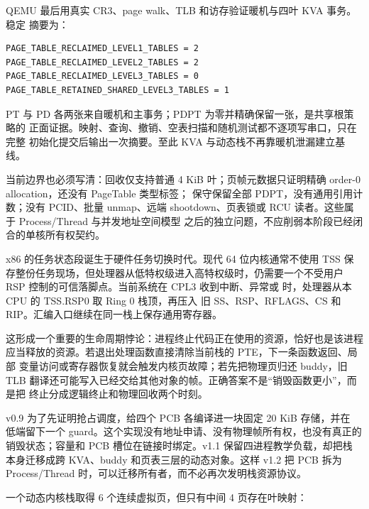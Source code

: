 QEMU 最后用真实 CR3、page walk、TLB 和访存验证暖机与四叶 KVA 事务。稳定
摘要为：

\begin{verbatim}
PAGE_TABLE_RECLAIMED_LEVEL1_TABLES = 2
PAGE_TABLE_RECLAIMED_LEVEL2_TABLES = 2
PAGE_TABLE_RECLAIMED_LEVEL3_TABLES = 0
PAGE_TABLE_RETAINED_SHARED_LEVEL3_TABLES = 1
\end{verbatim}

PT 与 PD 各两张来自暖机和主事务；PDPT 为零并精确保留一张，是共享根策略的
正面证据。映射、查询、撤销、空表扫描和随机测试都不逐项写串口，只在完整
初始化提交后输出一次摘要。至此 KVA 与动态栈不再靠暖机泄漏建立基线。

当前边界也必须写清：回收仅支持普通 4 KiB 叶；页帧元数据只证明精确
order-0 allocation，还没有 PageTable 类型标签；
保守保留全部 PDPT，没有通用引用计数；没有 PCID、批量 unmap、远端
shootdown、页表锁或 RCU 读者。这些属于 Process/Thread 与并发地址空间模型
之后的独立问题，不应削弱本阶段已经闭合的单核所有权契约。

x86 的任务状态段诞生于硬件任务切换时代。现代 64 位内核通常不使用 TSS
保存整份任务现场，但处理器从低特权级进入高特权级时，仍需要一个不受用户
RSP 控制的可信落脚点。当前系统在 CPL3 收到中断、异常或
 时，处理器从本 CPU 的 TSS.RSP0 取 Ring 0 栈顶，再压入
旧 SS、RSP、RFLAGS、CS 和 RIP。汇编入口继续在同一栈上保存通用寄存器。

这形成一个重要的生命周期悖论：进程终止代码正在使用的资源，恰好也是该进程
应当释放的资源。若退出处理函数直接清除当前栈的 PTE，下一条函数返回、局部
变量访问或寄存器恢复就会触发内核页故障；若先把物理页归还 buddy，旧 TLB
翻译还可能写入已经交给其他对象的帧。正确答案不是“销毁函数更小”，而是把
终止分成逻辑终止和物理回收两个时刻。

v0.9 为了先证明抢占调度，给四个 PCB 各编译进一块固定 20 KiB 存储，并在
低端留下一个 guard。这个实现没有地址申请、没有物理帧所有权，也没有真正的
销毁状态；容量和 PCB 槽位在链接时绑定。v1.1 保留四进程教学负载，却把栈
本身迁移成跨 KVA、buddy 和页表三层的动态对象。这样 v1.2 把 PCB 拆为
Process/Thread 时，可以迁移所有者，而不必再次发明栈资源协议。

一个动态内核栈取得 6 个连续虚拟页，但只有中间 4 页存在叶映射：

\begin{center}
\end{center}

